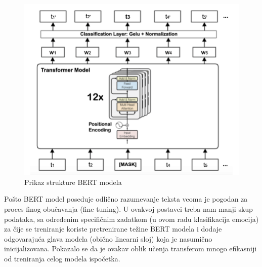 \documentclass{article}
\theoremstyle{definition}
\begin{document}
	\begin{figure}[h]
		\centering
		\includegraphics[width=\textwidth]{bert}
		\caption{Prikaz strukture BERT modela \label{bert-slika}}
	\end{figure}

	Pošto BERT model poseduje odlično razumevanje teksta veoma je pogodan za 
	proces finog obučavanja (fine tuning). U ovakvoj postavci treba nam manji 
	skup podataka, sa određenim specifičnim zadatkom (u ovom radu klasifikacija
	emocija) za čije se treniranje koriste pretrenirane težine BERT modela i 
	dodaje odgovarajuća glava modela (obično linearni sloj) koja je nasumično
	inicijalizovana. Pokazalo se da je ovakav oblik učenja transferom mnogo
	efikasniji od treniranja celog modela ispočetka.
\end{document}
